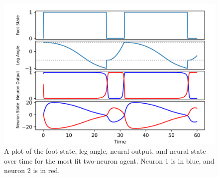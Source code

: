\documentclass{article}
\begin{document}
\begin{figure}[htbp]
  \centering
  \includegraphics[width=\textwidth]{../plots/angleTime2_224_18_Foot.png}
  \caption{A plot of the foot state, leg angle, neural output, and neural state over time for the most fit two-neuron agent. Neuron 1 is in blue, and neuron 2 is in red.}
  \label{fig:fullplot2Best}
\end{figure}
\end{document}

